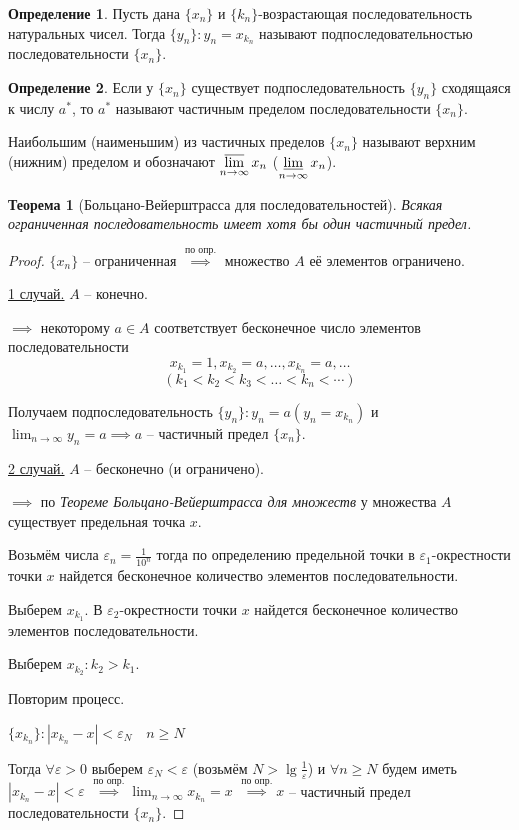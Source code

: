 \documentclass[a4paper,oneside]{article}
\newcommand{\bydef}{\stackrel{\text{по опр.}}{\implies}} %
\newcommand{\dslim}{\displaystyle\lim}
\newcommand{\dslimn}{\dslim_{n \to \infty}}
\newtheorem{theorem}{Теорема}[subsection]
\theoremstyle{definition}
\newtheorem{definition}{Определение}[subsection]
\theoremstyle{definition}
\theoremstyle{definition}
\begin{document}
\begin{definition}
    Пусть дана $\{x_n\}$ и $\{k_n\}$-возрастающая последовательность натуральных чисел.
    Тогда $\{y_n\}: y_n = x_{k_n}$ называют подпоследовательностью последовательности $\{x_n\}$.
\end{definition}

\begin{definition}
    Если у $\{x_n\}$ существует подпоследовательность $\{y_n\}$ сходящаяся к числу $a^*$,
    то $a^*$ называют частичным пределом последовательности $\{x_n\}$.
    
    Наибольшим (наименьшим) из частичных пределов $\{x_n\}$ называют верхним (нижним) пределом
    и обозначают $\displaystyle\varlimsup_{n \to \infty} x_n$
    ($\displaystyle\varliminf_{n \to \infty} x_n$).
\end{definition}

\begin{theorem}[Больцано-Вейерштрасса для последовательностей]
    Всякая ограниченная последовательность имеет хотя бы один частичный предел.    
\end{theorem}
\begin{proof}
    $\{x_n\}$ -- ограниченная $\bydef$ множество $A$ её
    элементов ограничено.
    
    \underline{1 случай.} $A$ -- конечно.
    
    $\implies$ некоторому $a \in A$ соответствует бесконечное число элементов последовательности 
    \[x_{k_1} = 1, x_{k_2} = a, \dots, x_{k_n} = a, \dots\]
    \[(k_1 < k_2 < k_3 < \dots < k_n < \cdots)\]
    
    Получаем подпоследовательность $\{y_n\}: y_n = a (y_n = x_{k_n})$ и
    $\dslimn y_n = a \implies a$ -- частичный предел $\{x_n\}$.
    
    \underline{2 случай.} $A$ -- бесконечно (и ограничено).
    
    $\implies$ по \textit{Теореме Больцано-Вейерштрасса для множеств} у множества $A$
    существует предельная точка $x$.
    
    Возьмём числа $\varepsilon_n = \frac{1}{10^n}$ тогда по определению предельной точки
    в $\varepsilon_1$-окрестности точки $x$ найдется бесконечное количество элементов последовательности.
    
    Выберем $x_{k_1}$. В $\varepsilon_2$-окрестности точки $x$ найдется бесконечное
    количество элементов последовательности.
    
    Выберем $x_{k_2}: k_2 > k_1$.
    
    Повторим процесс.
    
    $\{x_{k_n}\}: \left| x_{k_n} - x \right| < \varepsilon_N \quad n \ge N$
    
    Тогда $\forall \varepsilon > 0$ выберем $\varepsilon_N < \varepsilon$
    (возьмём $N > \lg \frac{1}{\varepsilon}$) и $\forall n \ge N$ будем иметь 
    $\left| x_{k_n} - x \right| < \varepsilon$ 
    $\bydef \dslimn x_{k_n} = x$
    $\bydef x$ -- частичный предел последовательности $\{x_n\}$.    
\end{proof}
\end{document}
